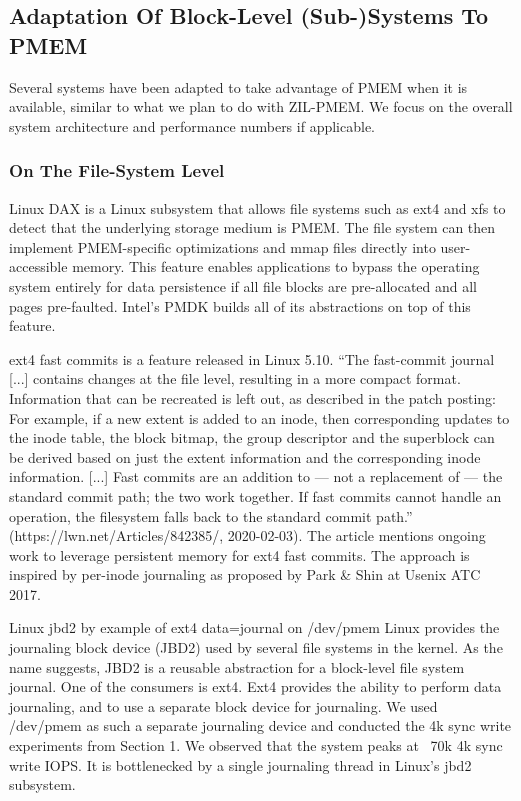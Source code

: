 \documentclass[12pt,a4paper,twoside,draft]{book}
\begin{document}
\subsection{Adaptation Of Block-Level (Sub-)Systems To PMEM}
Several systems have been adapted to take advantage of PMEM when it is available, similar to what we plan to do with ZIL-PMEM.
We focus on the overall system architecture and performance numbers if applicable.

\subsubsection{On The File-System Level}
Linux DAX is a Linux subsystem that allows file systems such as ext4 and xfs to detect that the underlying storage medium is PMEM.
The file system can then implement PMEM-specific optimizations and mmap files directly into user-accessible memory.
This feature enables applications to bypass the operating system entirely for data persistence if all file blocks are pre-allocated and all pages pre-faulted.
Intel’s PMDK builds all of its abstractions on top of this feature.

ext4 fast commits is a feature released in Linux 5.10.
  “The fast-commit journal [...] contains changes at the file level, resulting in a more compact format.
  Information that can be recreated is left out, as described in the patch posting:
  For example, if a new extent is added to an inode, then  corresponding updates to the inode table, the block bitmap, the group descriptor and the superblock can be derived based on just the extent information and the corresponding inode information.
  [...] Fast commits are an addition to — not a replacement of — the standard commit path; the two work together.
  If fast commits cannot handle an operation, the filesystem falls back to the standard commit path.”
  (https://lwn.net/Articles/842385/, 2020-02-03).
The article mentions ongoing work to leverage persistent memory for ext4 fast commits.
The approach is inspired by per-inode journaling as proposed by Park \& Shin at Usenix ATC 2017.

Linux jbd2 by example of ext4 data=journal on /dev/pmem Linux provides the journaling block device (JBD2) used by several file systems in the kernel.
As the name suggests, JBD2 is a reusable abstraction for a block-level file system journal.
One of the consumers is ext4. Ext4 provides the ability to perform data journaling, and to use a separate block device for journaling.
We used /dev/pmem as such a separate journaling device and conducted the 4k sync write experiments from Section 1.
We observed that the system peaks at ~70k 4k sync write IOPS.
It is bottlenecked by a single journaling thread in Linux’s jbd2 subsystem.
\end{document}
